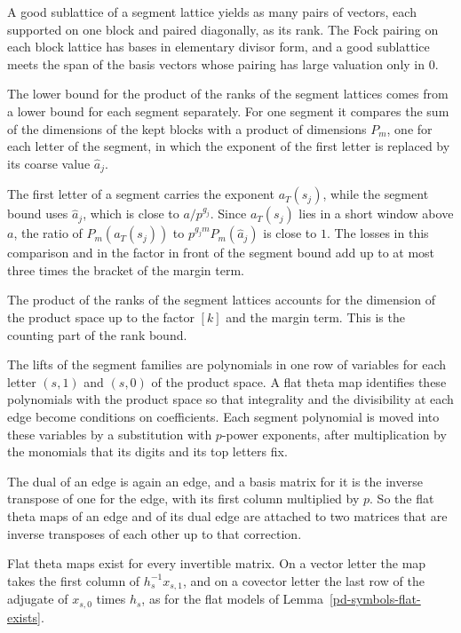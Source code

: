 A good sublattice of a segment lattice yields as many pairs of vectors, each supported on one block and
paired diagonally, as its rank. The Fock pairing on each block lattice has bases in elementary divisor
form, and a good sublattice meets the span of the basis vectors whose pairing has large valuation only
in $0$.

The lower bound for the product of the ranks of the segment lattices comes from a lower bound for each
segment separately. For one segment it compares the sum of the dimensions of the kept blocks with a
product of dimensions $P_m$, one for each letter of the segment, in which the exponent of the first
letter is replaced by its coarse value $\hat a_j$.

The first letter of a segment carries the exponent $a_T(s_j)$, while the segment bound uses
$\hat a_j$, which is close to $a/p^{g_j}$. Since $a_T(s_j)$ lies in a short window above $a$, the ratio of
$P_m(a_T(s_j))$ to $p^{g_jm}P_m(\hat a_j)$ is close to $1$. The losses in this comparison and in the
factor in front of the segment bound add up to at most three times the bracket of the margin term.

The product of the ranks of the segment lattices accounts for the dimension of the product space up to
the factor $[k]$ and the margin term. This is the counting part of the rank bound.

The lifts of the segment families are polynomials in one row of variables for each letter $(s,1)$ and $(s,0)$ of the
product space. A flat theta map identifies these polynomials with the product space so that integrality and the
divisibility at each edge become conditions on coefficients. Each segment polynomial is moved into these variables by a
substitution with $p$-power exponents, after multiplication by the monomials that its digits and its top letters fix.

The dual of an edge is again an edge, and a basis matrix for it is the inverse transpose of one for the edge, with its
first column multiplied by $p$. So the flat theta maps of an edge and of its dual edge are attached to two matrices that are
inverse transposes of each other up to that correction.

Flat theta maps exist for every invertible matrix. On a vector letter the map takes the first column of $h_s^{-1}x_{s,1}$,
and on a covector letter the last row of the adjugate of $x_{s,0}$ times $h_s$, as for the flat models of
Lemma~\ref{pd-symbols-flat-exists}.

